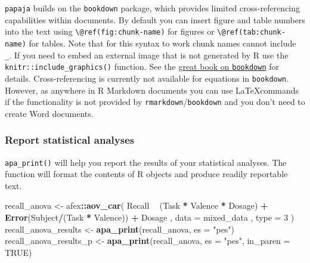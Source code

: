 \documentclass[english,man,floatsintext]{apa6}
\newenvironment{Shaded}{\begin{snugshade}}{\end{snugshade}}
\newcommand{\DataTypeTok}[1]{\textcolor[rgb]{0.13,0.29,0.53}{#1}}
\newcommand{\DecValTok}[1]{\textcolor[rgb]{0.00,0.00,0.81}{#1}}
\newcommand{\KeywordTok}[1]{\textcolor[rgb]{0.13,0.29,0.53}{\textbf{#1}}}
\newcommand{\NormalTok}[1]{#1}
\newcommand{\OperatorTok}[1]{\textcolor[rgb]{0.81,0.36,0.00}{\textbf{#1}}}
\newcommand{\OtherTok}[1]{\textcolor[rgb]{0.56,0.35,0.01}{#1}}
\newcommand{\StringTok}[1]{\textcolor[rgb]{0.31,0.60,0.02}{#1}}
\begin{document}
\texttt{papaja} builds on the \texttt{bookdown} package, which provides limited cross-referencing capabilities within documents.
By default you can insert figure and table numbers into the text using \texttt{\textbackslash{}@ref(fig:chunk-name)} for figures or \texttt{\textbackslash{}@ref(tab:chunk-name)} for tables.
Note that for this syntax to work chunk names cannot include \texttt{\_}.
If you need to embed an external image that is not generated by R use the \texttt{knitr::include\_graphics()} function.
See the \href{https://bookdown.org/yihui/bookdown/cross-references.html}{great book on \texttt{bookdown}} for details.
Cross-referencing is currently not available for equations in \texttt{bookdown}.
However, as anywhere in R Markdown documents you can use \LaTeX commands if the functionality is not provided by \texttt{rmarkdown}/\texttt{bookdown} and you don't need to create Word documents.

\hypertarget{report-statistical-analyses}{%
\subsubsection{Report statistical analyses}\label{report-statistical-analyses}}

\texttt{apa\_print()} will help you report the results of your statistical analyses.
The function will format the contents of R objects and produce readily reportable text.

\begin{Shaded}
\begin{Highlighting}[]
\NormalTok{recall_anova <-}\StringTok{ }\NormalTok{afex}\OperatorTok{::}\KeywordTok{aov_car}\NormalTok{(}
\NormalTok{  Recall }\OperatorTok{~}\StringTok{ }\NormalTok{(Task }\OperatorTok{*}\StringTok{ }\NormalTok{Valence }\OperatorTok{*}\StringTok{ }\NormalTok{Dosage) }\OperatorTok{+}\StringTok{ }\KeywordTok{Error}\NormalTok{(Subject}\OperatorTok{/}\NormalTok{(Task }\OperatorTok{*}\StringTok{ }\NormalTok{Valence)) }\OperatorTok{+}\StringTok{ }\NormalTok{Dosage}
\NormalTok{  , }\DataTypeTok{data =}\NormalTok{ mixed_data}
\NormalTok{  , }\DataTypeTok{type =} \DecValTok{3}
\NormalTok{)}
\NormalTok{recall_anova_results <-}\StringTok{ }\KeywordTok{apa_print}\NormalTok{(recall_anova, }\DataTypeTok{es =} \StringTok{"pes"}\NormalTok{)}
\NormalTok{recall_anova_results_p <-}\StringTok{ }\KeywordTok{apa_print}\NormalTok{(recall_anova, }\DataTypeTok{es =} \StringTok{"pes"}\NormalTok{, }\DataTypeTok{in_paren =} \OtherTok{TRUE}\NormalTok{)}
\end{Highlighting}
\end{Shaded}
\end{document}
